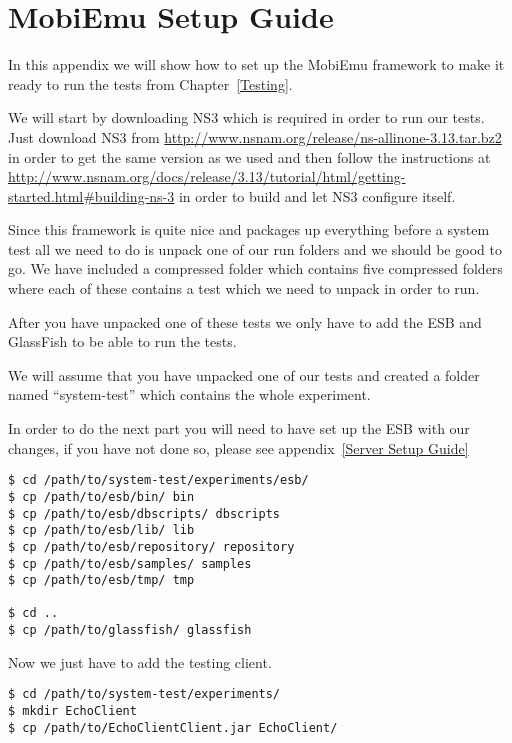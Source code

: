 \section{MobiEmu Setup Guide}\label{MobiEmu Setup Guide}

    In this appendix we will show how to set up the MobiEmu framework to make it ready to run the tests from Chapter~\ref{Testing}.

    We will start by downloading NS3 which is required in order to run our tests. Just download NS3 from \url{http://www.nsnam.org/release/ns-allinone-3.13.tar.bz2} in order to get the same version as we used and then follow the instructions at \url{http://www.nsnam.org/docs/release/3.13/tutorial/html/getting-started.html#building-ns-3} in order to build and let NS3 configure itself.

Since this framework is quite nice and packages up everything before a system test all we need to do is unpack one of our run folders and we should be good to go. We have included a compressed folder which contains five compressed folders where each of these contains a test which we need to unpack in order to run.

After you have unpacked one of these tests we only have to add the ESB and GlassFish to be able to run the tests.

We will assume that you have unpacked one of our tests and created a folder named “system-test” which contains the whole experiment.

\begin{shaded}
    In order to do the next part you will need to have set up the ESB with our changes, if you have not done so, please see appendix~\ref{Server Setup Guide}
\end{shaded}

\lstset{language=bash, style=shell}
\begin{lstlisting}[frame=single, caption={Copy ESB and GlassFish into System test}, label=mobiemu:copy esb, breaklines=true]
$ cd /path/to/system-test/experiments/esb/
$ cp /path/to/esb/bin/ bin
$ cp /path/to/esb/dbscripts/ dbscripts
$ cp /path/to/esb/lib/ lib
$ cp /path/to/esb/repository/ repository
$ cp /path/to/esb/samples/ samples
$ cp /path/to/esb/tmp/ tmp

$ cd ..
$ cp /path/to/glassfish/ glassfish
\end{lstlisting}


Now we just have to add the testing client.
\lstset{language=bash, style=shell}
\begin{lstlisting}[frame=single, caption={Adding the test client}, label=mobiemu:adding test client, breaklines=true]
$ cd /path/to/system-test/experiments/
$ mkdir EchoClient
$ cp /path/to/EchoClientClient.jar EchoClient/
\end{lstlisting}

